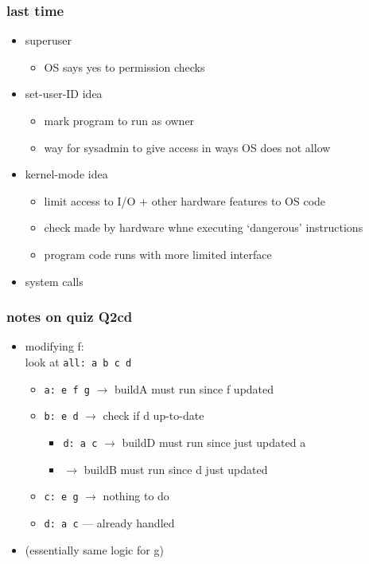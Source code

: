 \date{}
\title{}
\date{}

\begin{frame}
    \titlepage
\end{frame}



\begin{frame}
\frametitle{last time}
\begin{itemize}
\item superuser
    \begin{itemize}
    \item OS says yes to permission checks
    \end{itemize}
\item set-user-ID idea
    \begin{itemize}
    \item mark program to run as owner
    \item way for sysadmin to give access in ways OS does not allow
    \end{itemize}
\item kernel-mode idea
    \begin{itemize}
    \item limit access to I/O + other hardware features to OS code
    \item check made by hardware whne executing `dangerous' instructions
    \item program code runs with more limited interface
    \end{itemize}
\item system calls
\end{itemize}
\end{frame}

\begin{frame}
\frametitle{notes on quiz Q2cd}
\begin{itemize}
\item modifying f: \\ look at \texttt{all: a b c d}
    \begin{itemize}
    \item \texttt{a: e f g} $\rightarrow$ buildA must run since f updated
    \item \texttt{b: e d} $\rightarrow$ check if d up-to-date
        \begin{itemize}
        \item \texttt{d: a c} $\rightarrow$ buildD must run since just updated a
        \item $\rightarrow$ buildB must run since d just updated
        \end{itemize}
    \item \texttt{c: e g} $\rightarrow$ nothing to do
    \item \texttt{d: a c} --- already handled
    \end{itemize}
\item (essentially same logic for g)
\end{itemize}
\end{frame}

